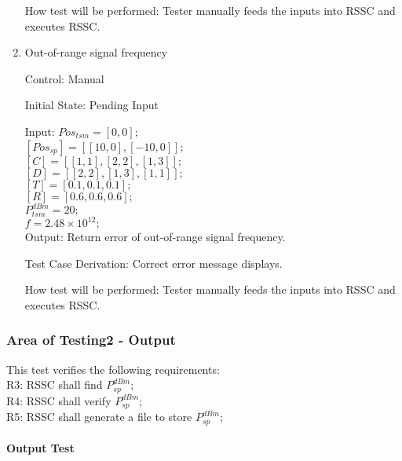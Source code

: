 \documentclass[12pt, titlepage]{article}
\begin{document}
\begin{enumerate}
How test will be performed: Tester manually feeds the inputs into
RSSC and executes RSSC.


\item{Out-of-range signal frequency\\}

Control: Manual
					
Initial State: Pending Input
					
Input:
$Pos_{tsm} = [0,0];$\\
$[Pos_{sp}] = [[10,0],[-10,0]];$\\
$[C] = [[1,1],[2,2],[1,3]];$\\
$[D] = [[2,2],[1,3],[1,1]];$\\
$[T] = [0.1,0.1,0.1];$\\
$[R] = [0.6,0.6,0.6];$\\
$P_{tsm}^{dBm} = 20;$\\
$f = 2.48\times10^{12};$\\

Output: Return error of out-of-range signal frequency.

Test Case Derivation: Correct error message displays.
					
How test will be performed: Tester manually feeds the inputs into
RSSC and executes RSSC.

\end{enumerate}

\subsubsection{Area of Testing2 - Output}\label{Aoutput}
\label{area2}

This test verifies the following requirements: \\
\indent  R3: RSSC shall find $P_{sp}^{dBm}$;\\
\indent  R4: RSSC shall verify $P_{sp}^{dBm}$;\\
\indent  R5: RSSC shall generate a file to store $P_{sp}^{dBm}$;\\

\paragraph{Output Test}
\end{document}
